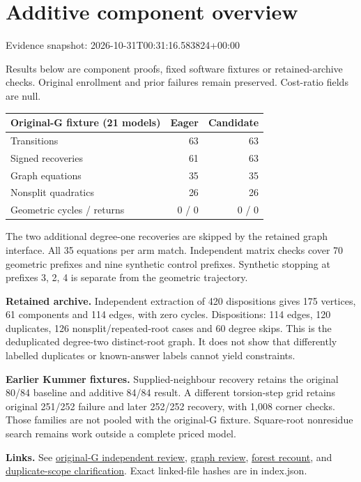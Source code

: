 \documentclass[11pt]{article}
\begin{document}
\section*{Additive component overview}
Evidence snapshot: 2026-10-31T00:31:16.583824+00:00

Results below are component proofs, fixed software fixtures or retained-archive checks. Original enrollment and prior failures remain preserved. Cost-ratio fields are null.

\begin{center}\begin{tabular}{lrr}\toprule
Original-G fixture (21 models) & Eager & Candidate\\\midrule
Transitions &63&63\\
Signed recoveries &61&63\\
Graph equations &35&35\\
Nonsplit quadratics &26&26\\
Geometric cycles / returns &0 / 0&0 / 0\\\bottomrule
\end{tabular}\end{center}

The two additional degree-one recoveries are skipped by the retained graph interface. All 35 equations per arm match. Independent matrix checks cover 70 geometric prefixes and nine synthetic control prefixes. Synthetic stopping at prefixes 3, 2, 4 is separate from the geometric trajectory.

\textbf{Retained archive.} Independent extraction of 420 dispositions gives 175 vertices, 61 components and 114 edges, with zero cycles. Dispositions: 114 edges, 120 duplicates, 126 nonsplit/repeated-root cases and 60 degree skips. This is the deduplicated degree-two distinct-root graph. It does not show that differently labelled duplicates or known-answer labels cannot yield constraints.

\textbf{Earlier Kummer fixtures.} Supplied-neighbour recovery retains the original 80/84 baseline and additive 84/84 result. A different torsion-step grid retains original 251/252 failure and later 252/252 recovery, with 1,008 corner checks. Those families are not pooled with the original-G fixture. Square-root nonresidue search remains work outside a complete priced model.

\textbf{Links.} See \href{../packets/kummer-original-gstep-review/status.json}{original-G independent review}, \href{../packets/kummer-graph-review/review.json}{graph review}, \href{../packets/geometric-forest-review/result.json}{forest recount}, and \href{../packets/geometric-forest-scope/ADDENDUM.md}{duplicate-scope clarification}. Exact linked-file hashes are in index.json.
\end{document}
